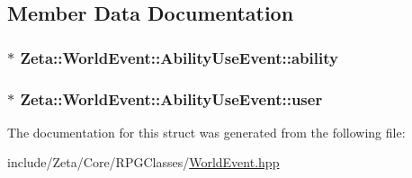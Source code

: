 \subsection{Member Data Documentation}
\hypertarget{structZeta_1_1WorldEvent_1_1AbilityUseEvent_a2d31acd2e159683b69c3046e1c355000}{
\subsubsection[{ability}]{$\ast$ Zeta\+::\+World\+Event\+::\+Ability\+Use\+Event\+::ability}}\label{structZeta_1_1WorldEvent_1_1AbilityUseEvent_a2d31acd2e159683b69c3046e1c355000}
\hypertarget{structZeta_1_1WorldEvent_1_1AbilityUseEvent_aab3be9afa99cc7fac216891e84abb3c1}{
\subsubsection[{user}]{$\ast$ Zeta\+::\+World\+Event\+::\+Ability\+Use\+Event\+::user}}\label{structZeta_1_1WorldEvent_1_1AbilityUseEvent_aab3be9afa99cc7fac216891e84abb3c1}


The documentation for this struct was generated from the following file\+:\begin{DoxyCompactItemize}
\item 
include/\+Zeta/\+Core/\+R\+P\+G\+Classes/\hyperlink{WorldEvent_8hpp}{World\+Event.\+hpp}\end{DoxyCompactItemize}
